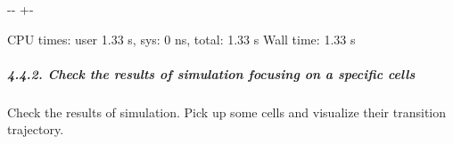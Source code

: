 \documentclass[letterpaper,10pt,english]{sphinxmanual}
\newlength\nbsphinxcodecellspacing
\begin{document}
%
{
\kern-\sphinxverbatimsmallskipamount\kern-\baselineskip
\kern+\FrameHeightAdjust\kern-\fboxrule
\vspace{\nbsphinxcodecellspacing}
%
\begin{sphinxVerbatim}[commandchars=\\\{\}]
CPU times: user 1.33 s, sys: 0 ns, total: 1.33 s
Wall time: 1.33 s
\end{sphinxVerbatim}
}
\relax


\subparagraph{4.4.2. Check the results of simulation focusing on a specific cells}
\label{\detokenize{notebooks/05_simulation/Gata1_KO_simulation_with_with_Paul_etal_2015_data:4.4.2.-Check-the-results-of-simulation-focusing-on-a-specific-cells}}
Check the results of simulation. Pick up some cells and visualize their transition trajectory.
\end{document}
